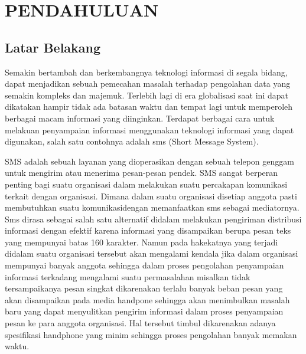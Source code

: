 \documentclass{jtetiproposalskripsi}
\begin{document}
\tableofcontents
{}
\clearpage{}\setcounter{page}{1}

\chapter{PENDAHULUAN}

\section{Latar Belakang}
Semakin bertambah dan berkembangnya teknologi informasi di segala bidang, dapat menjadikan sebuah pemecahan masalah terhadap pengolahan data yang semakin kompleks dan majemuk. Terlebih lagi di era globalisasi saat ini dapat dikatakan hampir tidak ada batasan waktu dan tempat lagi untuk memperoleh berbagai macam informasi yang diinginkan. Terdapat berbagai cara untuk melakuan penyampaian informasi menggunakan teknologi informasi yang dapat digunakan, salah satu contohnya adalah sms (Short Message System). 

SMS adalah sebuah layanan yang dioperasikan dengan sebuah telepon genggam untuk mengirim atau menerima pesan-pesan pendek. SMS sangat berperan penting bagi suatu organisasi dalam melakukan suatu percakapan komunikasi terkait dengan organisasi. Dimana dalam suatu organisasi disetiap anggota pasti membutuhkan suatu komunikasidengan memanfaatkan sms sebagai mediatornya. Sms dirasa sebagai salah satu alternatif didalam melakukan pengiriman distribusi informasi dengan efektif karena informasi yang disampaikan berupa pesan teks yang mempunyai batas 160 karakter. Namun pada hakekatnya yang terjadi didalam suatu organisasi tersebut akan mengalami kendala jika dalam organisasi mempunyai banyak anggota sehingga dalam proses pengolahan penyampaian informasi terkadang mengalami suatu permasalahan misalkan tidak tersampaikanya pesan singkat dikarenakan terlalu banyak beban pesan yang akan disampaikan pada media handpone sehingga akan menimbulkan masalah baru yang dapat menyulitkan pengirim informasi dalam proses penyampaian pesan ke para anggota organisasi. Hal tersebut timbul dikarenakan adanya spesifikasi handphone yang minim sehingga proses pengolahan banyak memakan waktu.
\end{document}
